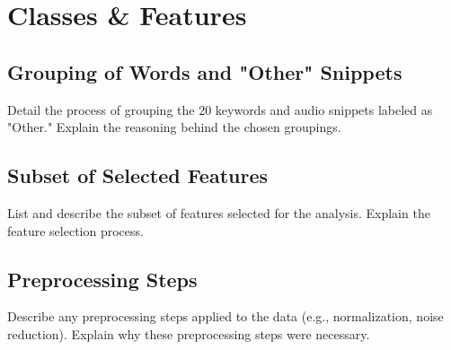 \section{Classes \& Features}

\subsection{Grouping of Words and "Other" Snippets}
Detail the process of grouping the 20 keywords and audio snippets labeled as "Other." Explain the reasoning behind the chosen groupings.

\subsection{Subset of Selected Features}
List and describe the subset of features selected for the analysis. Explain the feature selection process.

\subsection{Preprocessing Steps}
Describe any preprocessing steps applied to the data (e.g., normalization, noise reduction). Explain why these preprocessing steps were necessary.
